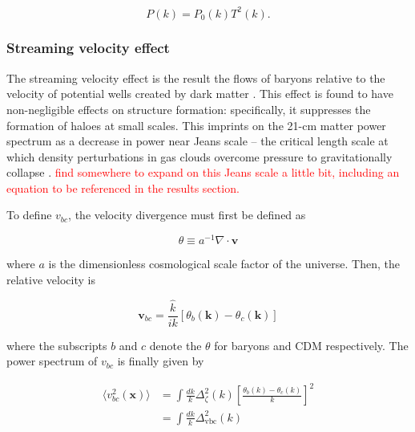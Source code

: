 \documentclass[floats,floatfix,showpacs,amssymb,prd,superscriptaddress,nofootinbib]{revtex4-2} %
\newcommand{\red}{\textcolor{red}}
\begin{document}
\begin{equation}
    P(k) = P_0 (k) T^2 (k).
    \label{eq:processed_power_spectrum}
\end{equation}

\subsubsection{Streaming velocity effect}
The streaming velocity effect is the result the flows of baryons relative to the velocity of potential wells created by dark matter \citep{Tseliakhovich_Hirata_2010}. This effect is found to have non-negligible effects on structure formation: specifically, it suppresses the formation of haloes at small scales. This imprints on the 21-cm matter power spectrum as a decrease in power near Jeans scale \citep{Tseliakhovich_Hirata_2010} -- the critical length scale at which density perturbations in gas clouds overcome pressure to gravitationally collapse \citep{Jeans_1902}. \red{find somewhere to expand on this Jeans scale a little bit, including an equation to be referenced in the results section.}

To define $v_{bc}$, the velocity divergence must first be defined as 

\begin{equation}
    \theta \equiv a^{-1} \nabla \cdot \textbf{v}
    \label{eq:velocity_divergence}
\end{equation}

\noindent where $a$ is the dimensionless cosmological scale factor of the universe. 
Then, the relative velocity is

\begin{equation}
    \textbf{v}_{bc} = \frac{\hat{k}}{ik} \left[ \theta_b (\textbf{k}) - \theta_c (\textbf{k}) \right]
    \label{eq:vbc_definition}
\end{equation}

\noindent where the subscripts $b$ and $c$ denote the $\theta$ for baryons and CDM respectively. The power spectrum of $v_{bc}$ is finally given by 

\begin{equation}
\begin{split}
        \langle v_{bc}^2 (\textbf{x}) \rangle 
        & = \int \frac{dk}{k} \Delta_\zeta^2 (k) \left[ \frac{\theta_b (k) - \theta_c (k)}{k} \right]^2 \\
        & = \int \frac{dk}{k} \Delta_{\text{vbc}}^2 (k)
\end{split}
\end{equation}
\end{document}
